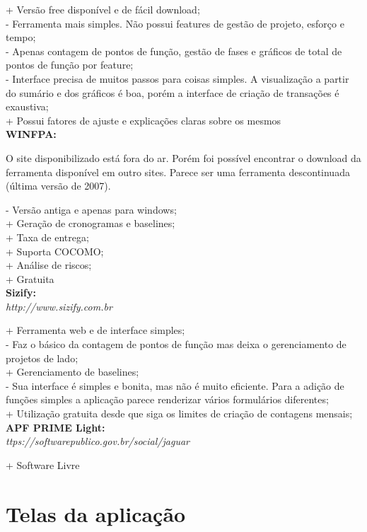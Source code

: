 \begin{apendicesenv}
\noindent + Versão free disponível e de fácil download;\\
- Ferramenta mais simples. Não possui features de gestão de projeto, esforço e tempo;\\
- Apenas contagem de pontos de função, gestão de fases e gráficos de total de pontos de função por feature;\\
- Interface precisa de muitos passos para coisas simples. A visualização a partir do sumário e dos gráficos é boa, porém a interface de criação de transações é exaustiva;\\
+ Possui fatores de ajuste e explicações claras sobre os mesmos\\

\noindent\textbf{WINFPA:}

O site disponibilizado está fora do ar. Porém foi possível encontrar o download da ferramenta disponível em outro sites. Parece ser uma ferramenta descontinuada (última versão de 2007).

\noindent- Versão antiga e apenas para windows;\\
+ Geração de cronogramas e baselines;\\
+ Taxa de entrega;\\
+ Suporta COCOMO;\\
+ Análise de riscos;\\
+ Gratuita\\

\noindent\textbf{Sizify:}\\
\textit{http://www.sizify.com.br}

\noindent + Ferramenta web e de interface simples;\\
- Faz o básico da contagem de pontos de função mas deixa o gerenciamento de projetos de lado;\\
+ Gerenciamento de baselines;\\
- Sua interface é simples e bonita, mas não é muito eficiente. Para a adição de funções simples a aplicação parece renderizar vários formulários diferentes;\\
+ Utilização gratuita desde que siga os limites de criação de contagens mensais;\\

\noindent\textbf{APF PRIME Light:}\\
\textit{ttps://softwarepublico.gov.br/social/jaguar}

\noindent + Software Livre


\chapter{Telas da aplicação}


\end{apendicesenv}
